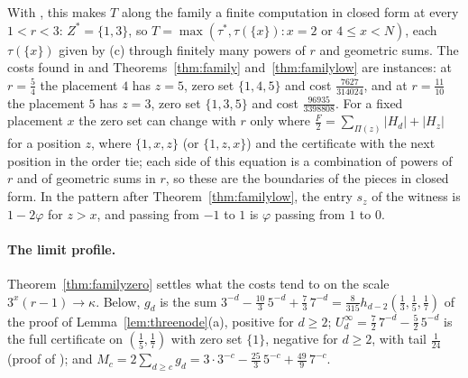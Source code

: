 \documentclass[11pt]{article}
\begin{document}
With \cite[Theorem~5.3]{coefficient-mass-attainment}, this makes $T$ along the family a finite
computation in closed form at every $1<r<3$: $Z^*=\{1,3\}$, so
$T=\max(\tau^*,\tau(\{x\}):x=2\text{ or }4\le x<N)$, each $\tau(\{x\})$
given by (c) through finitely many powers of $r$ and geometric sums.  The
costs found in \cite[Theorem~5.4]{coefficient-mass-attainment} and Theorems~\ref{thm:family}
and~\ref{thm:familylow} are instances: at $r=\tfrac54$ the placement $4$ has
$z=5$, zero set $\{1,4,5\}$ and cost $\tfrac{7627}{314024}$, and at
$r=\tfrac{11}{10}$ the placement $5$ has $z=3$, zero set $\{1,3,5\}$ and
cost $\tfrac{96935}{3398808}$.  For a fixed placement $x$ the zero set can
change with $r$ only where $\tfrac F2=\sum_{\Pi(z)}|H_d|+|H_z|$ for a
position $z$, where $\{1,x,z\}$ (or $\{1,z,x\}$) and the certificate with
the next position in the order tie; each side of this equation is a
combination of powers of $r$ and of geometric sums in $r$, so these are
the boundaries of the pieces in closed form.  In the pattern after
Theorem~\ref{thm:familylow}, the entry $s_z$ of the witness is
$1-2\varphi$ for $z>x$, and passing from $-1$ to $1$ is $\varphi$ passing
from $1$ to $0$.

\paragraph{The limit profile.}  Theorem~\ref{thm:familyzero} settles what
the costs tend to on the scale $3^x(r-1)\to\kappa$.  Below, $g_d$ is the
sum $3^{-d}-\tfrac{10}3\,5^{-d}+\tfrac73\,7^{-d}=\tfrac8{315}h_{d-2}(\tfrac13,\tfrac15,\tfrac17)$
of the proof of Lemma~\ref{lem:threenode}(a), positive for $d\ge2$;
$U^\infty_d=\tfrac72\,7^{-d}-\tfrac52\,5^{-d}$ is the full certificate on
$(\tfrac15,\tfrac17)$ with zero set $\{1\}$, negative for $d\ge2$, with
tail $\tfrac1{24}$ (proof of \cite[Proposition~5.5]{coefficient-mass-attainment}); and
$M_c=2\sum_{d\ge c}g_d=3\cdot3^{-c}-\tfrac{25}3\,5^{-c}+\tfrac{49}9\,7^{-c}$.
\end{document}

